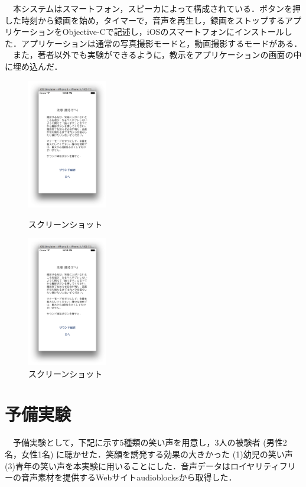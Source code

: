 \documentclass[submit,techreq]{ec2014}
\begin{document}
　本システムはスマートフォン，スピーカによって構成されている．ボタンを押した時刻から録画を始め，タイマーで，音声を再生し，録画をストップするアプリケーションをObjective-Cで記述し，iOSのスマートフォンにインストールした．アプリケーションは通常の写真撮影モードと，動画撮影するモードがある．
　また，著者以外でも実験ができるように，教示をアプリケーションの画面の中に埋め込んだ．
\begin{figure}[h]
\begin{minipage}{0.49\columnwidth}
\begin{center}
\includegraphics[width=35mm, bb=0 0 434 704]{images/ss/ss1.png}
\caption{スクリーンショット}
\end{center}
\end{minipage}
\begin{minipage}{0.49\columnwidth}
\begin{center}
\includegraphics[width=35mm, bb=0 0 434 704]{images/ss/ss1.png}
\caption{スクリーンショット}
\end{center}
\end{minipage}
\end{figure}

\section{予備実験}

　予備実験として，下記に示す5種類の笑い声を用意し，3人の被験者 (男性2名，女性1名) に聴かせた．笑顔を誘発する効果の大きかった (1)幼児の笑い声 (3)青年の笑い声を本実験に用いることにした．音声データはロイヤリティフリーの音声素材を提供するWebサイトaudioblocksから取得した．
\end{document}
